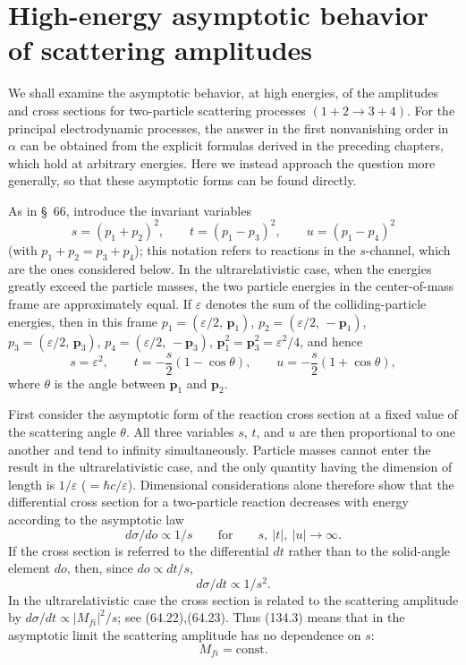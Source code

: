 \section{High-energy asymptotic behavior of scattering amplitudes}

We shall examine the asymptotic behavior, at high energies, of the amplitudes and cross sections for two-particle scattering processes $(1+2\to3+4)$. For the principal electrodynamic processes, the answer in the first nonvanishing order in $\alpha$ can be obtained from the explicit formulas derived in the preceding chapters, which hold at arbitrary energies. Here we instead approach the question more generally, so that these asymptotic forms can be found directly.

As in \S~66, introduce the invariant variables
\begin{equation}
s=(p_1+p_2)^2,\qquad t=(p_1-p_3)^2,\qquad u=(p_1-p_4)^2
\tag{134.1}
\end{equation}
(with $p_1+p_2=p_3+p_4$); this notation refers to reactions in the $s$-channel, which are the ones considered below. In the ultrarelativistic case, when the energies greatly exceed the particle masses, the two particle energies in the center-of-mass frame are approximately equal. If $\varepsilon$ denotes the sum of the colliding-particle energies, then in this frame $p_1=(\varepsilon/2,\,\mathbf p_1)$, $p_2=(\varepsilon/2,\,-\mathbf p_1)$, $p_3=(\varepsilon/2,\,\mathbf p_3)$, $p_4=(\varepsilon/2,\,-\mathbf p_3)$, $\mathbf p_1^2=\mathbf p_3^2=\varepsilon^2/4$, and hence
\begin{equation}
s=\varepsilon^2,\qquad t=-\frac{s}{2}(1-\cos\theta),\qquad
u=-\frac{s}{2}(1+\cos\theta),
\tag{134.2}
\end{equation}
where $\theta$ is the angle between $\mathbf p_1$ and $\mathbf p_2$.

First consider the asymptotic form of the reaction cross section at a fixed value of the scattering angle $\theta$. All three variables $s$, $t$, and $u$ are then proportional to one another and tend to infinity simultaneously. Particle masses cannot enter the result in the ultrarelativistic case, and the only quantity having the dimension of length is $1/\varepsilon$ ($=\hbar c/\varepsilon$). Dimensional considerations alone therefore show that the differential cross section for a two-particle reaction decreases with energy according to the asymptotic law
\begin{equation}
d\sigma/do\propto1/s\qquad\text{for}\qquad s,\ |t|,\ |u|\to\infty.
\tag{134.3}
\end{equation}
If the cross section is referred to the differential $dt$ rather than to the solid-angle element $do$, then, since $do\propto dt/s$,
\begin{equation}
d\sigma/dt\propto1/s^2.
\tag{134.4}
\end{equation}
In the ultrarelativistic case the cross section is related to the scattering amplitude by $d\sigma/dt\propto|M_{fi}|^2/s$; see (64.22),(64.23). Thus (134.3) means that in the asymptotic limit the scattering amplitude has no dependence on $s$:
\begin{equation}
M_{fi}=\mathrm{const}.
\tag{134.5}
\end{equation}

